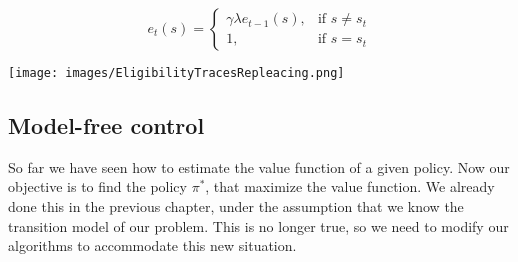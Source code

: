 \documentclass[../main.tex]{subfiles}
\begin{document}
\begin{equation}
    e_t(s) =
    \begin{cases}
        \gamma \lambda e_{t-1}(s), & \text{if }s \neq s_t \\
        1,                         & \text{if }s=s_t
    \end{cases}
\end{equation}
\begin{center}
    \texttt{[image: images/EligibilityTracesRepleacing.png]}
\end{center}
\newpage

\subsection{Model-free control}
So far we have seen how to estimate the value function of a given policy. Now our objective is to find the policy $\pi^*$, that maximize the value function. We already done this in the previous chapter, under the assumption that we know the transition model of our problem. This is no longer true, so we need to modify our algorithms to accommodate this new situation.
\end{document}

